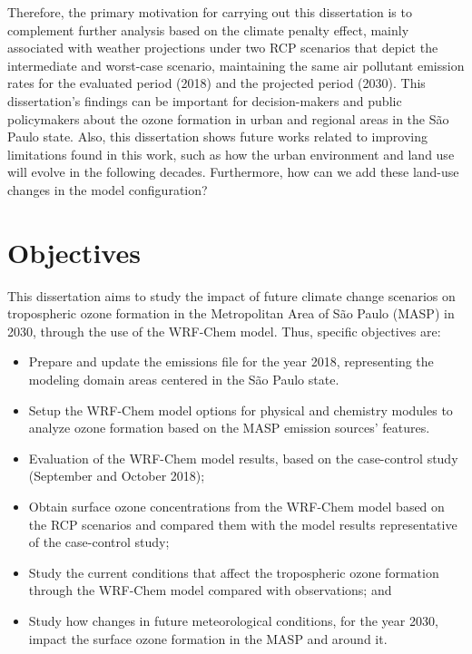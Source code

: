 Therefore, the primary motivation for carrying out this dissertation is to complement further analysis based on the climate penalty effect, mainly associated with weather projections under two RCP scenarios that depict the intermediate and worst-case scenario, maintaining the same air pollutant emission rates for the evaluated period (2018) and the projected period (2030).
This dissertation's findings can be important for decision-makers and public policymakers about the ozone formation in urban and regional areas in the S\~{a}o Paulo state.
Also, this dissertation shows future works related to improving limitations found in this work, such as how the urban environment and land use will evolve in the following decades.
Furthermore, how can we add these land-use changes in the model configuration?


\section{Objectives}\label{sec:obj}
	
	This dissertation aims to study the impact of future climate change scenarios on tropospheric ozone formation in the Metropolitan Area of S\~{a}o Paulo (MASP) in 2030, through the use of the WRF-Chem model. Thus, specific objectives are:
	
	\begin{itemize}
		\item Prepare and update the emissions file for the year 2018, representing the modeling domain areas centered in the S\~{a}o Paulo state.
		\item Setup the WRF-Chem model options for physical and chemistry modules to analyze ozone formation based on the MASP emission sources' features. 
		\item Evaluation of the WRF-Chem model results, based on the case-control study (September and October 2018);
		\item Obtain surface ozone concentrations from the WRF-Chem model based on the RCP scenarios and compared them with the model results representative of the case-control study;
		\item Study the current conditions that affect the tropospheric ozone formation through the WRF-Chem model compared with observations; and
		\item Study how changes in future meteorological conditions, for the year 2030, impact the surface ozone formation in the MASP and around it.
	\end{itemize}
	
